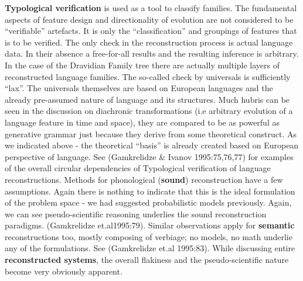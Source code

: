 \textbf{Typological verification} is used as a tool to classify families. The fundamental aspects of feature design and directionality of evolution are not considered to be “verifiable” artefacts. It is only the “classification” and groupings of features that is to be verified. The only check in the reconstruction process is actual language data. In their absence a free-for-all results and the resulting inference is arbitrary. In the case of the Dravidian Family tree there are actually multiple layers of reconstructed language families. The so-called check by universals is sufficiently “lax”. The universals themselves are based on European languages and the already pre-assumed nature of language and its structures. Much hubris can be seen in the discussion on diachronic transformations (i.e arbitrary evolution of a language feature in time and space), they are compared to be as powerful as generative grammar just because they derive from some theoretical construct. As we indicated above - the theoretical “basis” is already created based on European perspective of language. See (Gamkrelidze \& Ivanov 1995:75,76,77) for examples of the overall circular dependencies of Typological verification of language reconstructions. Methods for phonological (\textbf{sound}) reconstruction have a few assumptions. Again there is nothing to indicate that this is the ideal formulation of the problem space - we had suggested probabilistic models previously. Again, we can see pseudo-scientific reasoning underlies the sound reconstruction paradigms. (Gamkrelidze et.al1995:79). Similar observations apply for \textbf{semantic} reconstructions too, mostly composing of verbiage; no models, no math underlie any of the formulations. See (Gamkrelidze et.al 1995:83). While discussing entire \textbf{reconstructed systems}, the overall flakiness and the pseudo-scientific nature become very obviously apparent.

